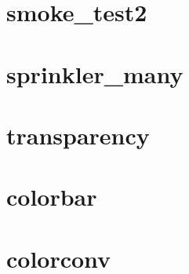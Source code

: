 \documentclass[11pt,twoside]{book}
\newcommand{\fdsinput}[1]{
{
\scriptsize

}
}
\begin{document}
\section{smoke\_test2}
\label{SSFsmoketest2}
\fdsinput{smoke_test2.ssf}

\section{sprinkler\_many}
\label{SSFspinklermany}
\fdsinput{sprinkler_many.ssf}

\section{transparency}
\label{SSFtransparency}
\fdsinput{transparency.ssf}

\section{colorbar}
\label{SSFcolorbar}
\fdsinput{colorbar.ssf}

\section{colorconv}
\label{SSFcolorconv}
\fdsinput{colorconv.ssf}
\end{document}
